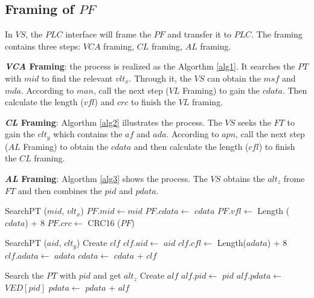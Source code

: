 \documentclass[journal,UTF8]{IEEEtran}
\begin{document}
\subsection{Framing of $PF$}
In $VS$, the $PLC$ interface will frame the $PF$ and transfer it to $PLC$. The framing contains three steps: $VCA$ framing, $CL$ framing, $AL$ framing.


\textbf{\emph{VCA} Framing}: the process is realized as the Algorthm \ref{alg1}. It searches the $PT$ with $mid$ to find the relevant $vlt_x$. Through it, the $VS$ can obtain the $msf$ and $mda$. According to $man$, call the next step ($VL$ Framing) to gain the $cdata$. Then calculate the length ($vfl$) and $crc$ to finish the $VL$ framing.

\textbf{\emph{CL} Framing}: Algorthm \ref{alg2} illustrates the process. The $VS$ seeks the $FT$ to gain the $clt_y$ which contains the $af$ and $ada$. According to $apn$, call the next step ($AL$ Framing) to obtain the $cdata$ and then calculate the length ($cfl$) to finish the $CL$ framing.  

\textbf{\emph{AL} Framing}: Algorthm \ref{alg3} shows the process. The $VS$ obtains the $alt_z$ frome $FT$ and then combines the $pid$ and $pdata$.


\begin{algorithm}
	\label{alg1}
	\caption{$VCAFraming$}%
	SearchPT ($mid$, $vlt_x$)\;
	$PF.mid\leftarrow mid$\; 
    $PF.cdata\leftarrow$ $cdata$\; 
	$PF.vfl\leftarrow$ Length ($cdata$) + 8\;
	$PF.crc\leftarrow$ CRC16 ($PF$)\;		 
\end{algorithm}

\begin{algorithm}
	\label{alg2}
	\caption{$CLFraming$}%
	SearchPT ($aid$, $clt_y$)\;
	Create $clf$\;
	$clf.aid\leftarrow$ $aid$\;
	$clf.cfl \leftarrow$ Length($adata$) + 8\;
	$clf.adata \leftarrow$ $adata$\;	
	$cdata\leftarrow$ $cdata$ + $clf$\;	 
\end{algorithm}
\begin{algorithm}
	\label{alg3}
	\caption{$ALFraming$}%
	Search the $PT$ with $pid$ and get $alt_z$\;
	Create $alf$\;
	$alf.pid\leftarrow$ $pid$\; %
	$alf.pdata \leftarrow$ $VED[pid]$\;
	$pdata\leftarrow$ $pdata$ + $alf$\;	 
\end{algorithm}
\end{document}
